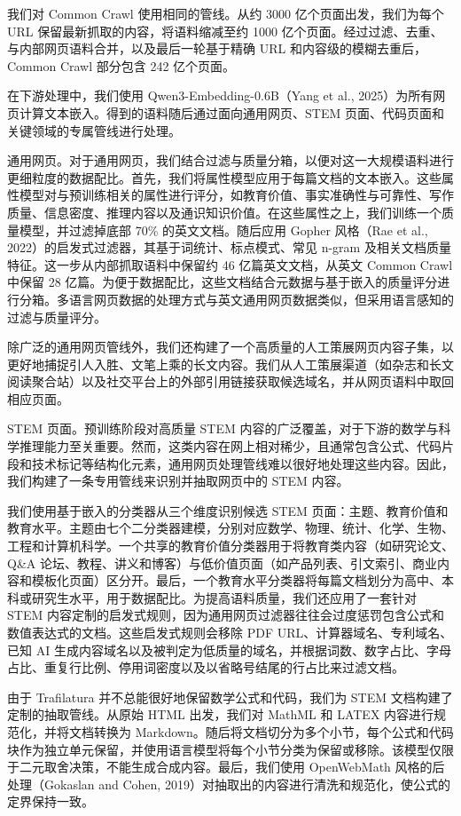 我们对 Common Crawl 使用相同的管线。从约 3000 亿个页面出发，我们为每个 URL 保留最新抓取的内容，将语料缩减至约 1000 亿个页面。经过过滤、去重、与内部网页语料合并，以及最后一轮基于精确 URL 和内容级的模糊去重后，Common Crawl 部分包含 242 亿个页面。

在下游处理中，我们使用 Qwen3-Embedding-0.6B（Yang et al., 2025）为所有网页计算文本嵌入。得到的语料随后通过面向通用网页、STEM 页面、代码页面和关键领域的专属管线进行处理。

通用网页。对于通用网页，我们结合过滤与质量分箱，以便对这一大规模语料进行更细粒度的数据配比。首先，我们将属性模型应用于每篇文档的文本嵌入。这些属性模型对与预训练相关的属性进行评分，如教育价值、事实准确性与可靠性、写作质量、信息密度、推理内容以及通识知识价值。在这些属性之上，我们训练一个质量模型，并过滤掉底部 70\% 的英文文档。随后应用 Gopher 风格（Rae et al., 2022）的启发式过滤器，其基于词统计、标点模式、常见 n-gram 及相关文档质量特征。这一步从内部抓取语料中保留约 46 亿篇英文文档，从英文 Common Crawl 中保留 28 亿篇。为便于数据配比，这些文档结合元数据与基于嵌入的质量评分进行分箱。多语言网页数据的处理方式与英文通用网页数据类似，但采用语言感知的过滤与质量评分。

除广泛的通用网页管线外，我们还构建了一个高质量的人工策展网页内容子集，以更好地捕捉引人入胜、文笔上乘的长文内容。我们从人工策展渠道（如杂志和长文阅读聚合站）以及社交平台上的外部引用链接获取候选域名，并从网页语料中取回相应页面。

STEM 页面。预训练阶段对高质量 STEM 内容的广泛覆盖，对于下游的数学与科学推理能力至关重要。然而，这类内容在网上相对稀少，且通常包含公式、代码片段和技术标记等结构化元素，通用网页处理管线难以很好地处理这些内容。因此，我们构建了一条专用管线来识别并抽取网页中的 STEM 内容。

我们使用基于嵌入的分类器从三个维度识别候选 STEM 页面：主题、教育价值和教育水平。主题由七个二分类器建模，分别对应数学、物理、统计、化学、生物、工程和计算机科学。一个共享的教育价值分类器用于将教育类内容（如研究论文、Q\&A 论坛、教程、讲义和博客）与低价值页面（如产品列表、引文索引、商业内容和模板化页面）区分开。最后，一个教育水平分类器将每篇文档划分为高中、本科或研究生水平，用于数据配比。为提高语料质量，我们还应用了一套针对 STEM 内容定制的启发式规则，因为通用网页过滤器往往会过度惩罚包含公式和数值表达式的文档。这些启发式规则会移除 PDF URL、计算器域名、专利域名、已知 AI 生成内容域名以及被判定为低质量的域名，并根据词数、数字占比、字母占比、重复行比例、停用词密度以及以省略号结尾的行占比来过滤文档。

由于 Trafilatura 并不总能很好地保留数学公式和代码，我们为 STEM 文档构建了定制的抽取管线。从原始 HTML 出发，我们对 MathML 和 LATEX 内容进行规范化，并将文档转换为 Markdown。随后将文档切分为多个小节，每个公式和代码块作为独立单元保留，并使用语言模型将每个小节分类为保留或移除。该模型仅限于二元取舍决策，不能生成合成内容。最后，我们使用 OpenWebMath 风格的后处理（Gokaslan and Cohen, 2019）对抽取出的内容进行清洗和规范化，使公式的定界保持一致。

